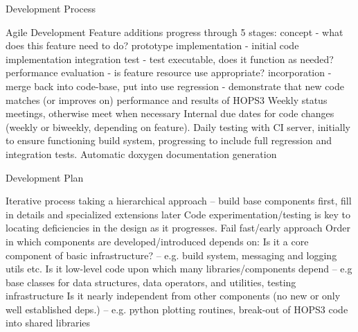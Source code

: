 \documentclass[8pt]{beamer}
\begin{document}
\begin{frame}{Development Process}
    \begin{outline}
        \1 Agile Development
        \1 Feature additions progress through 5 stages:
            \2 concept - what does this feature need to do?
            \2 prototype implementation - initial code implementation
            \2 integration test - test executable, does it function as needed?
            \2 performance evaluation - is feature resource use appropriate?
            \2 incorporation - merge back into code-base, put into use
            \2 regression - demonstrate that new code matches (or improves on) performance and results of HOPS3
        \1 Weekly status meetings, otherwise meet when necessary
        \1 Internal due dates for code changes (weekly or biweekly, depending on feature).
        \1 Daily testing with CI server, initially to ensure functioning build system, progressing to include full regression and integration tests.
        \1 Automatic doxygen documentation generation
    \end{outline}
\end{frame}

\begin{frame}{Development Plan}


    \begin{outline}
    \1 Iterative process taking a hierarchical approach -- build base components first, fill in details and specialized extensions later
    \1 Code experimentation/testing is key to locating deficiencies in the design as it progresses. Fail fast/early approach
    \1 Order in which components are developed/introduced depends on:
    \2 Is it a core component of basic infrastructure? -- e.g. build system, messaging and logging utils etc.
    \2 Is it low-level code upon which many libraries/components depend -- e.g base classes for data structures, data operators, and utilities, testing infrastructure
    \2 Is it nearly independent from other components (no new or only well established deps.) -- e.g. python plotting routines, break-out of HOPS3 code into shared libraries
    \end{outline}
\end{frame}
    
\end{document}
